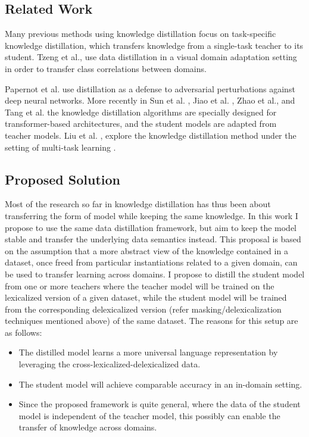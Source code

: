 \documentclass{article}
\begin{document}
\subsection{Related Work}


Many previous methods using knowledge distillation focus on task-specific knowledge distillation, which transfers knowledge from a single-task teacher to its student. Tzeng et al.\citep*{tzeng2015simultaneous}, use data distillation in a visual domain adaptation setting in order to transfer class correlations between domains. 

Papernot et al. \citep*{papernot2016distillation} use distillation as a defense to adversarial perturbations against deep neural networks. More recently in Sun et al. \citep*{sun2019patient} , Jiao et al. \citep*{jiao2019tinybert},  Zhao et al.\citep*{zhao2019extreme}, and Tang et al. \citep*{tang2019distilling} the knowledge distillation algorithms are specially designed for transformer-based architectures, and the student models are adapted from teacher models. Liu et al. \citep*{liu2019attentive}, explore the knowledge distillation method under the setting of multi-task learning \citep*{caruana1997multitask} \citep*{baxter2000model}.




\subsection{Proposed Solution}

Most of the research so far in knowledge distillation has thus been about transferring the form of model while keeping the same knowledge. In this work I propose to use the same data distillation framework, but aim to keep the model stable and transfer the underlying data semantics instead. This proposal is based on the assumption that a more abstract view of the knowledge contained in a dataset, once freed from particular instantiations related to a given domain, can be used to transfer learning across domains. I propose to distill the student model from one or more teachers where the teacher model will be trained on the lexicalized version of a given dataset, while the student model will be trained from the corresponding delexicalized version (refer masking/delexicalization techniques mentioned above) of the same dataset. The reasons for this setup are as follows:

\begin{itemize}
  \item The distilled model learns a more universal language representation by leveraging the cross-lexicalized-delexicalized data.
  \item The student model will achieve comparable accuracy in an in-domain setting.
  \item Since the proposed framework is quite general, where the data of the student model is independent of the teacher model, this possibly can enable the transfer of knowledge across domains.
\end{itemize}
\end{document}
